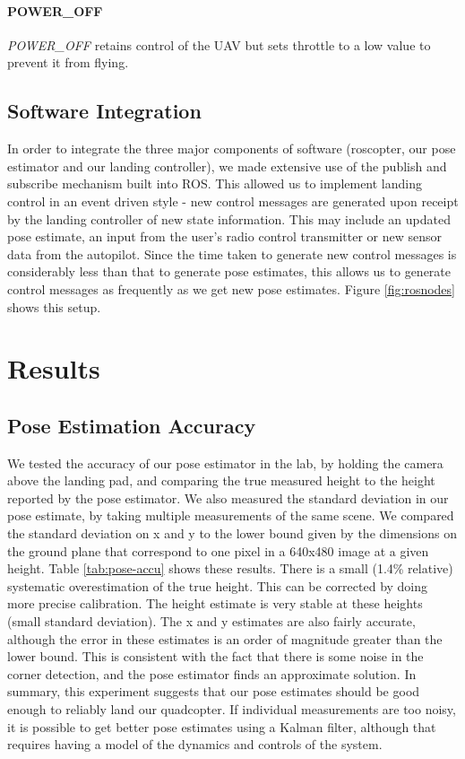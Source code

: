 \documentclass[10pt]{scrartcl} %
\begin{document}
\paragraph{POWER\_OFF}
\textit{POWER\_OFF} retains control of the UAV but sets throttle to a low value
to prevent it from flying.

\subsection{Software Integration}

In order to integrate the three major components of software (roscopter, our
pose estimator and our landing controller), we made extensive use of the
publish and subscribe mechanism built into ROS. This allowed us to implement
landing control in an event driven style - new control messages are generated
upon receipt by the landing controller of new state information. This may
include an updated pose estimate, an input from the user's radio control
transmitter or new sensor data from the autopilot. Since the time taken to
generate new control messages is considerably less than that to generate pose
estimates, this allows us to generate control messages as frequently as we get
new pose estimates. Figure \ref{fig:rosnodes} shows this setup.

\section{Results}

\subsection{Pose Estimation Accuracy}
\label{sec:accuracy}

We tested the accuracy of our pose estimator in the lab, by holding the camera
above the landing pad, and comparing the true measured height to the height
reported by the pose estimator. We also measured the standard deviation in our
pose estimate, by taking multiple measurements of the same scene. We compared
the standard deviation on x and y to the lower bound given by the dimensions on
the ground plane that correspond to one pixel in a 640x480 image at a given
height. Table \ref{tab:pose-accu} shows these results. There is a small (1.4\%
relative) systematic overestimation of the true height. This can be corrected
by doing more precise calibration. The height estimate is very stable at these
heights (small standard deviation). The x and y estimates are also fairly
accurate, although the error in these estimates is an order of magnitude
greater than the lower bound. This is consistent with the fact that there is
some noise in the corner detection, and the pose estimator finds an approximate
solution. In summary, this experiment suggests that our pose estimates should
be good enough to reliably land our quadcopter. If individual measurements are
too noisy, it is possible to get better pose estimates using a Kalman filter,
although that requires having a model of the dynamics and controls of the
system.
\end{document}
